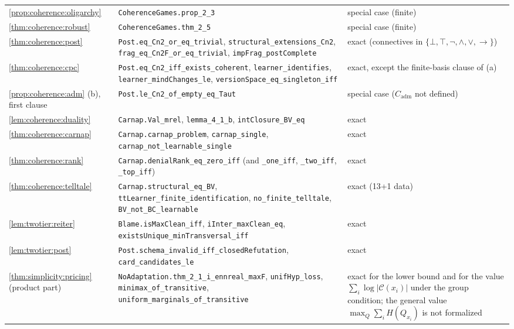 {\begin{longtable}{@{}>{\raggedright\arraybackslash}p{2.9cm}>{\raggedright\arraybackslash}p{7.6cm}>{\raggedright\arraybackslash}p{4.4cm}@{}}
\cref{prop:coherence:oligarchy} & \texttt{CoherenceGames.\allowbreak prop\_2\_3} & special case (finite)\\
\cref{thm:coherence:robust} & \texttt{CoherenceGames.\allowbreak thm\_2\_5} & special case (finite)\\
\cref{thm:coherence:post} & \texttt{Post.\allowbreak eq\_Cn2\_or\_eq\_trivial}, \texttt{structural\_extensions\_Cn2}, \texttt{frag\_eq\_Cn2F\_or\_eq\_trivial}, \texttt{impFrag\_postComplete} & exact (connectives in $\{\bot,\top,\neg,\wedge,\vee,\to\}$)\\
\cref{thm:coherence:cpc} & \texttt{Post.\allowbreak eq\_Cn2\_iff\_exists\_coherent}, \texttt{learner\_identifies}, \texttt{learner\_mindChanges\_le}, \texttt{versionSpace\_eq\_singleton\_iff} & exact, except the finite-basis clause of (a)\\
\cref{prop:coherence:adm} (b), first clause & \texttt{Post.\allowbreak le\_Cn2\_of\_empty\_eq\_Taut} & special case ($C_{\mathrm{adm}}$ not defined)\\
\cref{lem:coherence:duality} & \texttt{Carnap.\allowbreak Val\_mrel}, \texttt{lemma\_4\_1\_b}, \texttt{intClosure\_BV\_eq} & exact\\
\cref{thm:coherence:carnap} & \texttt{Carnap.\allowbreak carnap\_problem}, \texttt{carnap\_single}, \texttt{carnap\_not\_learnable\_single} & exact\\
\cref{thm:coherence:rank} & \texttt{Carnap.\allowbreak denialRank\_eq\_zero\_iff} (and \texttt{\_one\_iff}, \texttt{\_two\_iff}, \texttt{\_top\_iff}) & exact\\
\cref{thm:coherence:telltale} & \texttt{Carnap.\allowbreak structural\_eq\_BV}, \texttt{ttLearner\_finite\_identification}, \texttt{no\_finite\_telltale}, \texttt{BV\_not\_BC\_learnable} & exact (13+1 data)\\
\cref{lem:twotier:reiter} & \texttt{Blame.\allowbreak isMaxClean\_iff}, \texttt{iInter\_maxClean\_eq}, \texttt{existsUnique\_minTransversal\_iff} & exact\\
\cref{lem:twotier:post} & \texttt{Post.\allowbreak schema\_invalid\_iff\_closedRefutation}, \texttt{card\_candidates\_le} & exact\\
\cref{thm:simplicity:pricing} (product part) & \texttt{NoAdaptation.\allowbreak thm\_2\_1\_i\_ennreal\_maxF}, \texttt{unifHyp\_loss}, \texttt{minimax\_of\_transitive}, \texttt{uniform\_marginals\_of\_transitive} & exact for the lower bound and for the value $\sum_i\log|\mathcal C(x_i)|$ under the group condition; the general value $\max_Q\sum_iH(Q_{x_i})$ is not formalized\\

\end{longtable}}
